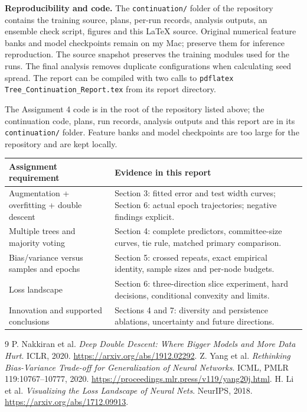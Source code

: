 \documentclass[11pt,a4paper]{article}
\begin{document}
\textbf{Reproducibility and code.} The \texttt{continuation/} folder of the repository contains the training source, plans, per-run records, analysis outputs, an ensemble check script, figures and this LaTeX source. Original numerical feature banks and model checkpoints remain on my Mac; preserve them for inference reproduction. The source snapshot preserves the training modules used for the runs. The final analysis removes duplicate configurations when calculating seed spread. The report can be compiled with two calls to \texttt{pdflatex Tree\_Continuation\_Report.tex} from its report directory.

The Assignment 4 code is in the root of the repository listed above; the continuation code, plans, run records, analysis outputs and this report are in its \texttt{continuation/} folder. Feature banks and model checkpoints are too large for the repository and are kept locally.

\begin{center}\small\begin{tabular}{p{48mm}p{103mm}}\toprule
Assignment requirement & Evidence in this report\\\midrule
Augmentation + overfitting + double descent & Section 3: fitted error and test width curves; Section 6: actual epoch trajectories; negative findings explicit.\\
Multiple trees and majority voting & Section 4: complete predictors, committee-size curves, tie rule, matched primary comparison.\\
Bias/variance versus samples and epochs & Section 5: crossed repeats, exact empirical identity, sample sizes and per-node budgets.\\
Loss landscape & Section 6: three-direction slice experiment, hard decisions, conditional convexity and limits.\\
Innovation and supported conclusions & Sections 4 and 7: diversity and persistence ablations, uncertainty and future directions.\\\bottomrule
\end{tabular}\end{center}

\begin{thebibliography}{9}\small
{} P. Nakkiran et al. \emph{Deep Double Descent: Where Bigger Models and More Data Hurt}. ICLR, 2020. \url{https://arxiv.org/abs/1912.02292}.
 Z. Yang et al. \emph{Rethinking Bias-Variance Trade-off for Generalization of Neural Networks}. ICML, PMLR 119:10767--10777, 2020. \url{https://proceedings.mlr.press/v119/yang20j.html}.
 H. Li et al. \emph{Visualizing the Loss Landscape of Neural Nets}. NeurIPS, 2018. \url{https://arxiv.org/abs/1712.09913}.
\end{thebibliography}
\end{document}
